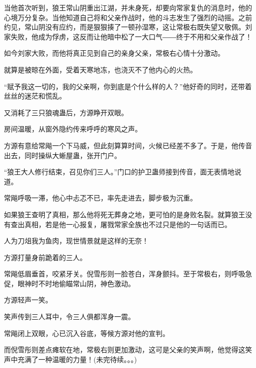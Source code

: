 \begin{this_body}
当他首次听到，狼王常山阴重出江湖，并未身死，却要向常家复仇的消息时，他的心境万分复杂。当他知道自己将和父亲作战时，他的斗志发生了强烈的动摇。之前约见，常山阴没有应约，而是狠狠揍了一顿孙湿寒，这让常极右既失望又敬佩。刘家失败，他成为俘虏，这反而让他暗中松了一大口气――终于不用和父亲作战了！

如今刘家大败，而他将真正见到自己的亲身父亲，常极右心情十分激动。

就算是被晾在外面，受着天寒地冻，也浇灭不了他内心的火热。

“赋予我这一切的，我的父亲啊，你到底是个什么样的人？”他好奇的同时，还带着丝丝的迷茫和慌乱。

又消耗了三只狼魂蛊后，方源睁开双眼。

房间温暖，从窗外隐约传来呼呼的寒风之声。

方源有意给常飚一个下马威，但此刻算算时间，火候已经差不多了。于是，他传音出去，同时操纵大蜥屋蛊，张开门户。

“狼王大人修行结束，召见你们三人。”门口的护卫蛊师接到传音，面无表情地说道。

常飚呼吸一滞，他心中忐忑不已，率先走进去，脚步极为沉重。

如果狼王查明了真相，那么他将死无葬身之地，更可怕的是身败名裂。就算狼王没有查出真相，若是他一心报复，屠戮常家全族也不过只是他的一句话而已。

人为刀俎我为鱼肉，现世情景就是这样的无奈！

方源打量身前跪着的三人。

常飚低眉垂首，咬紧牙关。倪雪彤则一脸苍白，浑身颤抖。至于常极右，则呼吸急促，眼神时不时地偷瞄常山阴，神色激动。

方源轻声一笑。

笑声传到三人耳中，令三人俱都浑身一震。

常飚闭上双眼，心已沉入谷底，等候方源对他的宣判。

而倪雪彤则差点瘫软在地，常极右则更加激动，这可是父亲的笑声啊，他觉得这笑声中充满了一种温暖的力量！(未完待续。。。)

\end{this_body}

